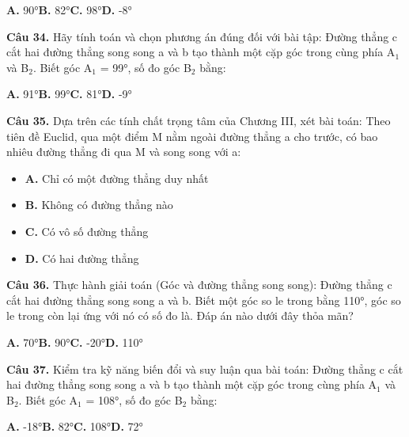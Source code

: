 \documentclass[11pt,a4paper]{article}
\begin{document}
\hspace*{1.5em}\textbf{A.} 90°\quad\quad \textbf{B.} 82°\quad\quad \textbf{C.} 98°\quad\quad \textbf{D.} -8°\par\vspace{2pt}
\textbf{\color{primary} Câu 34.} Hãy tính toán và chọn phương án đúng đối với bài tập: Đường thẳng c cắt hai đường thẳng song song a và b tạo thành một cặp góc trong cùng phía A$_1$ và B$_2$. Biết góc A$_1$ = 99°, số đo góc B$_2$ bằng:\par
\hspace*{1.5em}\textbf{A.} 91°\quad\quad \textbf{B.} 99°\quad\quad \textbf{C.} 81°\quad\quad \textbf{D.} -9°\par\vspace{2pt}
\textbf{\color{primary} Câu 35.} Dựa trên các tính chất trọng tâm của Chương III, xét bài toán: Theo tiên đề Euclid, qua một điểm M nằm ngoài đường thẳng a cho trước, có bao nhiêu đường thẳng đi qua M và song song với a:\par
\begin{itemize}\setlength{\itemsep}{1pt}\setlength{\parskip}{0pt}
  \item[] \textbf{A.} Chỉ có một đường thẳng duy nhất
  \item[] \textbf{B.} Không có đường thẳng nào
  \item[] \textbf{C.} Có vô số đường thẳng
  \item[] \textbf{D.} Có hai đường thẳng
\end{itemize}\vspace{2pt}
\textbf{\color{primary} Câu 36.} Thực hành giải toán (Góc và đường thẳng song song): Đường thẳng c cắt hai đường thẳng song song a và b. Biết một góc so le trong bằng 110°, góc so le trong còn lại ứng với nó có số đo là. Đáp án nào dưới đây thỏa mãn?\par
\hspace*{1.5em}\textbf{A.} 70°\quad\quad \textbf{B.} 90°\quad\quad \textbf{C.} -20°\quad\quad \textbf{D.} 110°\par\vspace{2pt}
\textbf{\color{primary} Câu 37.} Kiểm tra kỹ năng biến đổi và suy luận qua bài toán: Đường thẳng c cắt hai đường thẳng song song a và b tạo thành một cặp góc trong cùng phía A$_1$ và B$_2$. Biết góc A$_1$ = 108°, số đo góc B$_2$ bằng:\par
\hspace*{1.5em}\textbf{A.} -18°\quad\quad \textbf{B.} 82°\quad\quad \textbf{C.} 108°\quad\quad \textbf{D.} 72°\par\vspace{2pt}
\end{document}
